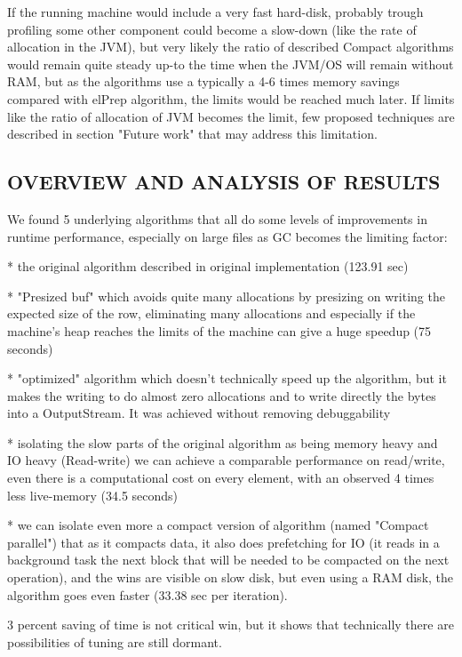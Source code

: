 \documentclass[a4paper,twoside]{article}
\begin{document}
If the running machine would include a very fast hard-disk, probably trough profiling some other component could become a slow-down (like the rate of allocation in the JVM), but very likely
the ratio of described Compact algorithms would remain quite steady up-to the time when the JVM/OS will remain without RAM, but as the algorithms use a typically a 4-6 times memory 
savings compared with elPrep algorithm, the limits would be reached much later.
If limits like the ratio of allocation of JVM becomes the limit, few proposed techniques are described in section
"Future work" that may address this limitation.


\subsection{\uppercase{Overview and analysis of results}}\label{subsec:uppercase6}

We found 5 underlying algorithms that all do some levels of improvements in runtime performance, especially on large files
as GC becomes the limiting factor:

* the original algorithm described in original implementation (123.91 sec)

* "Presized buf" which avoids quite many allocations by presizing on writing the expected size of the row, eliminating
many allocations and especially if the machine's heap reaches the limits of the machine can give a huge speedup (75 seconds)

* "optimized" algorithm which doesn't technically speed up the algorithm, but it makes the writing to do almost zero
allocations and to write directly the bytes into a OutputStream.
It was achieved without removing debuggability

* isolating the slow parts of the original algorithm as being memory heavy and IO heavy (Read-write) we can achieve a
comparable performance on read/write, even there is a computational cost on every element, with an observed 4 times
less live-memory (34.5 seconds)

* we can isolate even more a compact version of algorithm (named "Compact parallel") that as it compacts data, it also does prefetching for IO (it reads in a background task the next block that will be needed to be compacted on the next operation),
and the wins are visible on slow disk, but even using a RAM disk, the algorithm goes even faster (33.38 sec per iteration).

3 percent saving of time is not critical win, but it shows that technically there are possibilities of tuning are still dormant.
\end{document}
